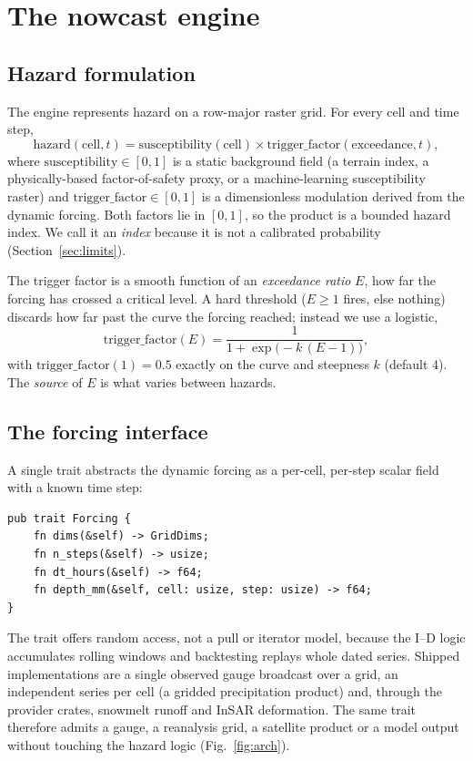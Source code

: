 \documentclass[authoryear,preprint,review,12pt]{elsarticle}
\begin{document}
\section{The nowcast engine}

\subsection{Hazard formulation}

The engine represents hazard on a row-major raster grid. For every cell and time
step,
\begin{equation}
\mathrm{hazard}(\mathrm{cell},t)=\mathrm{susceptibility}(\mathrm{cell})\times
\mathrm{trigger\_factor}(\mathrm{exceedance},t),
\label{eq:hazard}
\end{equation}
where $\mathrm{susceptibility}\in[0,1]$ is a static background field (a terrain
index, a physically-based factor-of-safety proxy, or a machine-learning
susceptibility raster) and $\mathrm{trigger\_factor}\in[0,1]$ is a dimensionless
modulation derived from the dynamic forcing. Both factors lie in $[0,1]$, so the
product is a bounded hazard index. We call it an \emph{index} because it is not a calibrated probability (Section~\ref{sec:limits}).

The trigger factor is a smooth function of an \emph{exceedance ratio} $E$, how
far the forcing has crossed a critical level. A hard threshold ($E\geq 1$ fires,
else nothing) discards how far past the curve the forcing reached; instead we use
a logistic,
\begin{equation}
\mathrm{trigger\_factor}(E)=\frac{1}{1+\exp\!\big(-k\,(E-1)\big)},
\label{eq:logistic}
\end{equation}
with $\mathrm{trigger\_factor}(1)=0.5$ exactly on the curve and steepness $k$
(default 4). The \emph{source} of $E$ is what varies between hazards.

\subsection{The forcing interface}

A single trait abstracts the dynamic forcing as a per-cell, per-step scalar field
with a known time step:
\begin{verbatim}
pub trait Forcing {
    fn dims(&self) -> GridDims;
    fn n_steps(&self) -> usize;
    fn dt_hours(&self) -> f64;
    fn depth_mm(&self, cell: usize, step: usize) -> f64;
}
\end{verbatim}
The trait offers random access, not a pull or iterator model, because the I--D logic accumulates rolling windows and backtesting replays whole dated series. Shipped
implementations are a single observed gauge broadcast over a grid, an independent
series per cell (a gridded precipitation product) and, through the provider
crates, snowmelt runoff and InSAR deformation. The same trait therefore admits a
gauge, a reanalysis grid, a satellite product or a model output without touching
the hazard logic (Fig.~\ref{fig:arch}).
\end{document}
